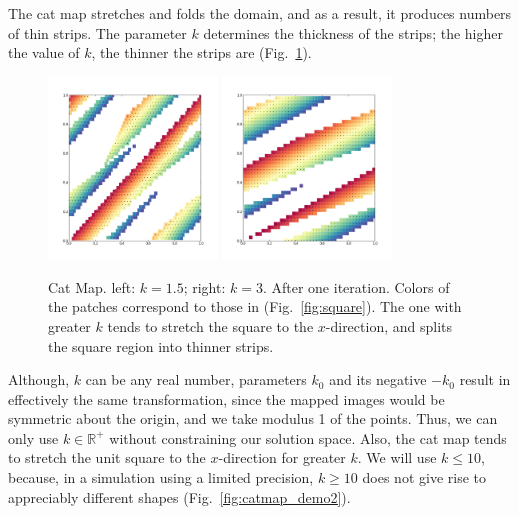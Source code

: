 \documentclass[12pt]{reedmcm}
\begin{document}
The cat map stretches and folds the domain, and as a result, it produces numbers of thin strips.
The parameter $k$ determines the thickness of the strips;
the higher the value of $k$, the thinner the strips are (Fig.~\ref{fig:catmap_demo1}).
\begin{figure}[p]
  \centering
  \includegraphics[width=0.4\textwidth]{catmap_1-5}
  \hspace{2cm}
  \includegraphics[width=0.4\textwidth]{catmap_3}
  \caption{Cat Map. left: $k=1.5$; right: $k = 3$. After one iteration. 
    Colors of the patches correspond to those in (Fig.~\ref{fig:square}).
    The one with greater $k$ tends to stretch the square to the $x$-direction, and splits the square region into thinner strips.
  }
  \label{fig:catmap_demo1}
\end{figure}
%
Although, $k$ can be any real number, parameters $k_0$ and its negative $-k_0$ result in effectively the same transformation, since the mapped images would be symmetric about the origin, and we take modulus 1 of the points.
Thus, we can only use $k \in \mathbb{R}^+$ without constraining our solution space.
Also, the cat map tends to stretch the unit square to the $x$-direction for greater $k$.
We will use $k \leq 10$, because, in a simulation using a limited precision, $k\geq 10$ does not give rise to appreciably different shapes (Fig.~\ref{fig:catmap_demo2}).
\end{document}
